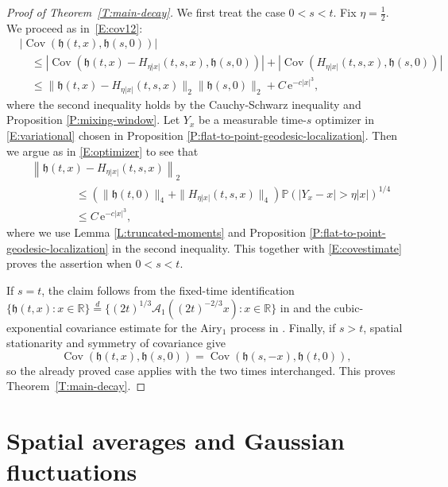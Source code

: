 \documentclass[12pt, reqno]{amsart}
\numberwithin{equation}{section}
\theoremstyle{definition}
\newcommand{\R}{\mathbb{R}}
\newcommand{\h}{\mathfrak{h}}
\newcommand{\Cov}{\operatorname{Cov}}
\newcommand{\Prob}{\mathbb{P}}
\newcommand{\e}{\,\mathrm{e}}
\newcommand{\Acal}{\mathcal{A}}
\begin{document}
\begin{proof}[Proof of Theorem~\ref{T:main-decay}]
  We first treat the case $0<s<t$. Fix $\eta=\frac12$. We proceed as
  in~\eqref{E:cov12}:
  \begin{align}\label{E:covestimate}
    & \left|\Cov(\h(t,x), \h(s,0))\right| \nonumber                                                                                            \\
    & \quad\leq  \left|\Cov(\h(t,x)- H_{\eta |x|}(t,s,x), \h(s,0))\right| + \left|\Cov(H_{\eta|x|}(t,s,x), \h(s,0))\right| \nonumber \\
    & \quad \leq \|\h(t,x)- H_{\eta |x|}(t,s,x)\|_2\| \h(s,0)\|_2+ C\e^{-c |x|^3},
  \end{align}
  where the second inequality holds by the Cauchy-Schwarz inequality and
  Proposition \ref{P:mixing-window}. Let $Y_x$ be a measurable time-$s$
  optimizer in \eqref{E:variational} chosen in Proposition
  \ref{P:flat-to-point-geodesic-localization}. Then we argue as in
  \eqref{E:optimizer} to see that
  \begin{align*}
    & \left\|\h(t,x)- H_{\eta |x|}(t,s,x)\right\|_2                                                      \\
    & \qquad\qquad \leq \left(\|\h(t,0)\|_4+\|H_{\eta|x|}(t,s,x)\|_4\right) \Prob(|Y_x-x|>\eta|x|)^{1/4} \\
    & \qquad\qquad \leq C\e^{-c |x|^3},
  \end{align*}
  where we use Lemma \ref{L:truncated-moments} and Proposition
  \ref{P:flat-to-point-geodesic-localization} in the second inequality. This
  together with \eqref{E:covestimate} proves the assertion when $0<s<t$.

  If $s=t$, the claim follows from the fixed-time identification
  $\{\h(t,x):x\in\R\}\overset{d}{=} \{(2t)^{1/3}\Acal_1((2t)^{-2/3}x):x\in\R\}$
  in \cite[(4.15)]{matetski.quastel.ea:21:kpz}
  and the cubic-exponential covariance estimate for the Airy$_1$ process in
  \cite{basu.busani.ea:23:on}. Finally, if $s>t$, spatial stationarity and
  symmetry of covariance give
  \[
    \Cov(\h(t,x),\h(s,0))=\Cov(\h(s,-x),\h(t,0)),
  \]
  so the already proved case applies with the two times interchanged. This proves
  Theorem~\ref{T:main-decay}.
\end{proof}

\section{Spatial averages and Gaussian fluctuations}\label{S:fluctuations}
\end{document}
